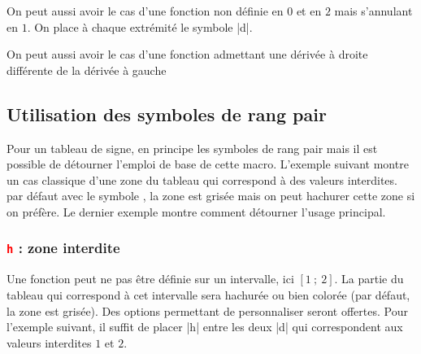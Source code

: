 On peut aussi avoir le cas d'une fonction  non définie en $0$ et en $2$ mais s'annulant en $1$. On place à chaque extrémité le symbole |d|.

\begin{tkzexample}[width=7cm,small]
\end{tkzexample}  
  
On peut aussi avoir le cas d'une fonction admettant une dérivée à droite différente de la dérivée à gauche

\begin{tkzexample}[width=7cm,small]
\end{tkzexample}  

\subsection{Utilisation des symboles de rang pair}  

Pour un tableau de signe, en principe les symboles de rang pair mais il est possible de détourner l'emploi de base de cette macro. L'exemple suivant montre un cas classique d'une zone du tableau qui correspond à des valeurs interdites. par défaut avec le symbole , la zone est grisée mais on peut hachurer cette zone si on préfère.
Le dernier exemple montre comment détourner l'usage principal.

\subsubsection{\texttt{\textcolor{red}{h}} : zone interdite}

Une fonction peut ne pas être définie sur un intervalle, ici $[1~;~2]$. La partie du tableau qui correspond à cet intervalle sera hachurée ou bien colorée (par défaut, la zone est grisée). Des options permettant de personnaliser seront offertes. Pour l'exemple suivant, il suffit de placer |h| entre les deux |d| qui correspondent aux valeurs interdites $1$ et  $2$.

\begin{tkzexample}[width=8cm, small]
\end{tkzexample}  

